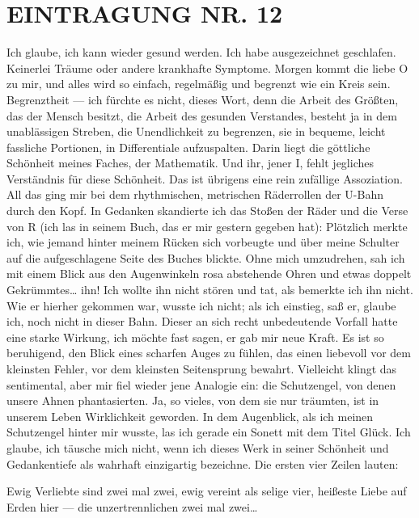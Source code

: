\section{EINTRAGUNG NR. 12}

Ich glaube, ich kann wieder gesund werden. Ich habe ausgezeichnet
geschlafen. Keinerlei Träume oder andere krankhafte Symptome.
Morgen kommt die liebe O zu mir, und alles wird so einfach,
regelmäßig und begrenzt wie ein Kreis sein. Begrenztheit — ich
fürchte es nicht, dieses Wort, denn die Arbeit des Größten, das der
Mensch besitzt, die Arbeit des gesunden Verstandes, besteht ja in
dem unablässigen Streben, die Unendlichkeit zu begrenzen, sie in
bequeme, leicht fassliche Portionen, in Differentiale aufzuspalten.
Darin liegt die göttliche Schönheit meines Faches, der Mathematik.
Und ihr, jener I, fehlt jegliches Verständnis für diese Schönheit.
Das ist übrigens eine rein zufällige Assoziation. All das ging mir
bei dem rhythmischen, metrischen Räderrollen
der U-Bahn durch den Kopf. In Gedanken skandierte ich das
Stoßen der Räder und die Verse von R (ich las in seinem Buch, das
er mir gestern gegeben hat): Plötzlich merkte ich, wie jemand
hinter meinem Rücken sich vorbeugte und über meine Schulter auf die
aufgeschlagene Seite des Buches blickte. Ohne mich umzudrehen, sah
ich mit einem Blick aus den Augenwinkeln rosa abstehende Ohren und
etwas doppelt Gekrümmtes\ldots{} ihn! Ich wollte ihn nicht stören und
tat, als bemerkte ich ihn nicht. Wie er hierher gekommen war,
wusste ich nicht; als ich einstieg, saß er, glaube ich, noch nicht
in dieser Bahn. Dieser an sich recht unbedeutende Vorfall hatte
eine starke Wirkung, ich möchte fast sagen, er gab mir neue Kraft.
Es ist so beruhigend, den Blick eines scharfen Auges zu fühlen, das
einen liebevoll vor dem kleinsten Fehler, vor dem kleinsten
Seitensprung bewahrt. Vielleicht klingt das sentimental, aber mir
fiel wieder jene Analogie ein: die Schutzengel, von denen unsere
Ahnen phantasierten. Ja, so vieles, von dem sie nur träumten, ist
in unserem Leben Wirklichkeit geworden. In dem Augenblick, als ich
meinen Schutzengel hinter mir wusste, las ich gerade ein Sonett mit
dem Titel Glück. Ich glaube, ich täusche mich nicht, wenn ich
dieses Werk in seiner Schönheit und Gedankentiefe als wahrhaft
einzigartig bezeichne. Die ersten vier Zeilen lauten:

Ewig Verliebte sind zwei mal zwei, ewig vereint als selige vier,
heißeste Liebe auf Erden hier — die unzertrennlichen zwei mal
zwei\ldots{}

